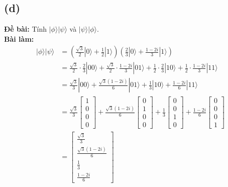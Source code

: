 \subsection{(d)}
\textbf{Đề bài:} Tính $|\phi\rangle|\psi\rangle$ và $|\psi\rangle|\phi\rangle$.\\
\textbf{Bài làm:}
\begin{align*}
    |\phi\rangle|\psi\rangle &= \left(\frac{\sqrt{3}}{2}|0\rangle+\frac{1}{2}|1\rangle\right)\left(\frac{2}{3}|0\rangle+\frac{1-2i}{3}|1\rangle\right)\\
    &= \frac{\sqrt{3}}{2}\cdot\frac{2}{3}|00\rangle + \frac{\sqrt{3}}{2}\cdot\frac{1-2i}{3}|01\rangle + \frac{1}{2}\cdot\frac{2}{3}|10\rangle + \frac{1}{2}\cdot\frac{1-2i}{3}|11\rangle\\
    &= \frac{\sqrt{3}}{3}|00\rangle + \frac{\sqrt{3}(1-2i)}{6}|01\rangle + \frac{1}{3}|10\rangle + \frac{1-2i}{6}|11\rangle\\
    &= \frac{\sqrt{3}}{3} \begin{bmatrix}
        1 \\
        0 \\
        0 \\
        0
    \end{bmatrix}
    + \frac{\sqrt{3}(1-2i)}{6} \begin{bmatrix}
        0 \\
        1 \\
        0 \\
        0
    \end{bmatrix}
    + \frac{1}{3} \begin{bmatrix}
        0 \\
        0 \\
        1 \\
        0
    \end{bmatrix}
    + \frac{1-2i}{6} \begin{bmatrix}
        0 \\
        0 \\
        0 \\
        1
    \end{bmatrix}\\
    &= \begin{bmatrix}
        \frac{\sqrt{3}}{3} \\
        \frac{\sqrt{3}(1-2i)}{6} \\
        \frac{1}{3} \\
        \frac{1-2i}{6}
    \end{bmatrix}
\end{align*}
